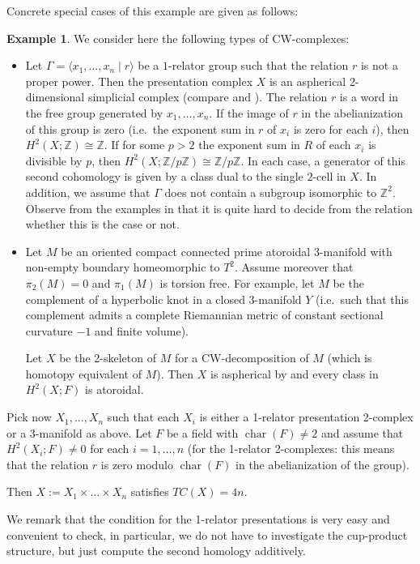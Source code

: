\documentclass[a4paper,twoside]{article}
\theoremstyle{plain}
\theoremstyle{definition}
\newtheorem{example}[theorem]{Example}
\theoremstyle{remark}
\newcommand{\integers}{\mathbb{Z}}
\newcommand{\iso}{\cong}
\DeclareMathOperator{\characteristic}{char}
\begin{document}
Concrete special cases of this example are given as follows:
\begin{example}

  We consider here the following types of CW-complexes:
  \begin{itemize}
  \item Let $\Gamma=\langle x_1,\dots,x_n\mid r\rangle$ be a $1$-relator group
    such that the relation $r$ is not a proper 
    power. Then the presentation complex $X$ is an aspherical 2-dimensional
    simplicial complex (compare \cite{Lyndon} and \cite[Section
    5]{ChiswellCollinsHuebschmann}). The relation $r$ is a word in the free
    group generated by $x_1,\dots, x_n$. If the image of $r$ in the
    abelianization of this group is zero (i.e.~the exponent sum in $r$ of
    $x_i$ is zero for each $i$), then $H^2(X;\integers)\iso\integers$. If for
    some $p>2$ the exponent sum in $R$ of each $x_i$ is divisible by $p$, then
    $H^2(X; \integers/p\integers)\iso \integers/p\integers$. In each case, a
    generator of this second cohomology is given by a class dual to the single
    $2$-cell in $X$. In addition, we assume that $\Gamma$ does not contain a
    subgroup isomorphic to $\integers^2$. Observe from the examples in
    \cite{Moldavanskii} that it is quite hard to decide from the relation
    whether this is the case or not.
  \item Let $M$ be an oriented compact connected prime atoroidal 3-manifold
    with non-empty boundary homeomorphic to $T^2$. Assume moreover that
    $\pi_2(M)=0$ and $\pi_1(M)$ is torsion 
    free. For example, let  $M$ be the complement of a hyperbolic knot in
    a closed 3-manifold $Y$ (i.e.~such that this 
    complement admits a complete Riemannian metric of constant sectional
    curvature $-1$ and finite volume). 

    Let $X$ be the 2-skeleton of $M$ for a CW-decomposition of $M$ (which is
    homotopy equivalent of $M$). Then $X$ is aspherical by \cite[Section
    5]{ChiswellCollinsHuebschmann} and every class in $H^2(X;F)$ is atoroidal. 
  \end{itemize}

  Pick now $X_1,\dots,X_n$ such that each $X_i$ is either a 1-relator presentation
  2-complex or a 3-manifold as above. Let $F$ be a field with
  $\characteristic(F)\ne 2$ and assume that 
  $H^2(X_i;F)\ne 0$ for each $i=1,\dots,n$
  (for the 1-relator 2-complexes: this means that the relation $r$ is zero
  modulo $\characteristic(F)$ in the abelianization of the group).

  Then $X:=X_1\times\dots\times X_n$ satisfies $TC(X)=4n$.

  We remark that the condition for the 1-relator presentations is very easy and
  convenient to check, in particular, we do not have to investigate the
  cup-product structure, but just compute the second homology additively.
\end{example}
\end{document}
